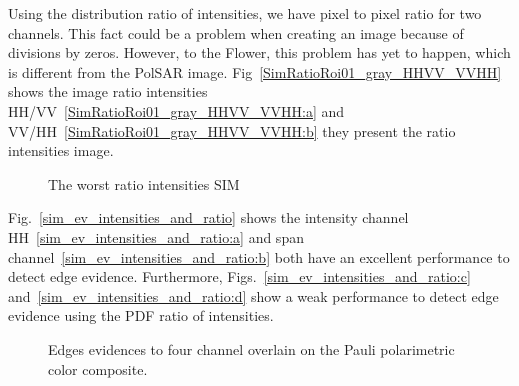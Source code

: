 \documentclass[remotesensing,article,submit,pdftex,moreauthors]{Definitions/mdpi}
\begin{document}
Using the distribution ratio of intensities, we have pixel to pixel ratio for two channels. This fact could be a problem when creating an image because of divisions by zeros. However, to the Flower, this problem has yet to happen, which is different from the PolSAR image. Fig~\eqref{SimRatioRoi01_gray_HHVV_VVHH} shows the image ratio intensities HH/VV~\eqref{SimRatioRoi01_gray_HHVV_VVHH:a} and VV/HH~\eqref{SimRatioRoi01_gray_HHVV_VVHH:b} they present the ratio intensities image.  
\begin{figure}[hbt]
	\centering
     \caption{The worst ratio intensities SIM} 
     \label{SimRatioRoi01_gray_HHVV_VVHH} 
\end{figure}
%

Fig.~\eqref{sim_ev_intensities_and_ratio}  shows the intensity channel HH~\eqref{sim_ev_intensities_and_ratio:a} and span channel~\eqref{sim_ev_intensities_and_ratio:b} both have an excellent performance to detect edge evidence. Furthermore, Figs.~\eqref{sim_ev_intensities_and_ratio:c} and~\eqref{sim_ev_intensities_and_ratio:d} show a weak performance to detect edge evidence using the PDF ratio of intensities.
\begin{figure}[hbt]
	\centering
     \caption{Edges evidences to four channel overlain on the Pauli polarimetric color composite.}
     \label{sim_ev_intensities_and_ratio} 
\end{figure}
\end{document}
